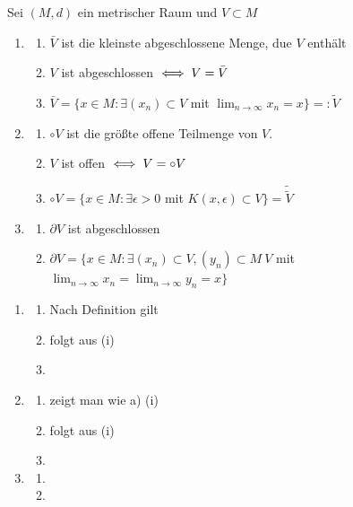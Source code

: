 \begin{prop}
	Sei $(M, d)$ ein metrischer Raum und $V \subset M$
	\begin{enumerate}[label=\alph*\upshape)]
		\item
			\begin{enumerate}
				\item $\bar V$ ist die kleinste abgeschlossene Menge, due $V$ enthält
				\item $V$ ist abgeschlossen $\iff V = \bar V$
				\item $\bar V = \{ x \in M: \exists (x_{n}) \subset V$ mit $\lim_{n \rightarrow \infty} x_{n} = x \} =: \tilde V$ %
			\end{enumerate} 
		\item 
			\begin{enumerate}
				\item $\circ V$ ist die grö{\ss}te offene Teilmenge von $V$. %
				\item $V$ ist offen $\iff V = \circ V$ %
				\item $\circ V = \{ x \in M: \exists \epsilon > 0$ mit $K(x, \epsilon) \subset V \} = \tilde \tilde V$ %
			\end{enumerate} 
		\item
			\begin{enumerate}
				\item $\partial V$ ist abgeschlossen
				\item $\partial V = \{ x \in M: \exists (x_{n}) \subset V, (y_{n}) \subset M \ V$ mit $ \lim_{n \rightarrow \infty} x_{n} = \lim_{n \rightarrow \infty} y_{n} = x \}$
			\end{enumerate} 
	\end{enumerate}	
	\begin{beweis}
		\begin{enumerate}[label=\alph*\upshape)]
			\item
				\begin{enumerate}
					\item Nach Definition gilt 
					\item folgt aus (i)
					\item %
				\end{enumerate} 
			\item 
				\begin{enumerate}
					\item zeigt man wie a) (i)
					\item folgt aus (i)
					\item %
				\end{enumerate} 
			\item
				\begin{enumerate}
					\item %
					\item %
				\end{enumerate} 
		\end{enumerate}	
	\end{beweis}
\end{prop}

